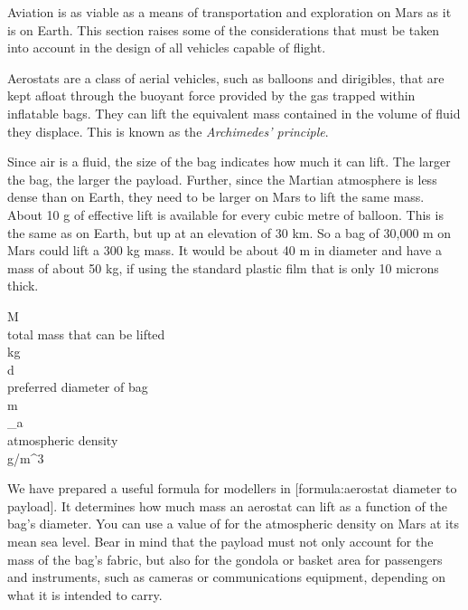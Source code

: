 

Aviation is as viable as a means of transportation and exploration on Mars as it is on Earth. This section raises some of the considerations that must be taken into account in the design of all vehicles capable of flight.

Aerostats are a class of aerial vehicles, such as balloons and dirigibles, that are kept afloat through the buoyant force provided by the gas trapped within inflatable bags. They can lift the equivalent mass contained in the volume of fluid they displace. This is known as the {\it Archimedes' principle}. 

Since air is a fluid, the size of the bag indicates how much it can lift. The larger the bag, the larger the payload. Further, since the Martian atmosphere is less dense than on Earth, they need to be larger on Mars to lift the same mass. About 10 g of effective lift is available for every cubic metre of balloon. This is the same as on Earth, but up at an elevation of 30 km. So a bag of 30,000 m on Mars could lift a 300 kg mass. It would be about 40 m in diameter and have a mass of about 50 kg, if using the standard plastic film that is only 10 microns thick.

\crlf
{}
\startformula
{}
\stopformula
\startlegend
\leg M \\ total mass that can be lifted \\ kg \\
\leg d \\ preferred diameter of bag \\ m \\
\leg {\rho}_a \\ atmospheric density \\ g/m^{3} \\
\stoplegend
\crlf

We have prepared a useful formula for modellers in [formula:aerostat diameter to payload]. It determines how much mass an aerostat can lift as a function of the bag's diameter. You can use a value of  for the atmospheric density on Mars at its mean sea level. Bear in mind that the payload must not only account for the mass of the bag's fabric, but also for the gondola or basket area for passengers and instruments, such as cameras or communications equipment, depending on what it is intended to carry.

